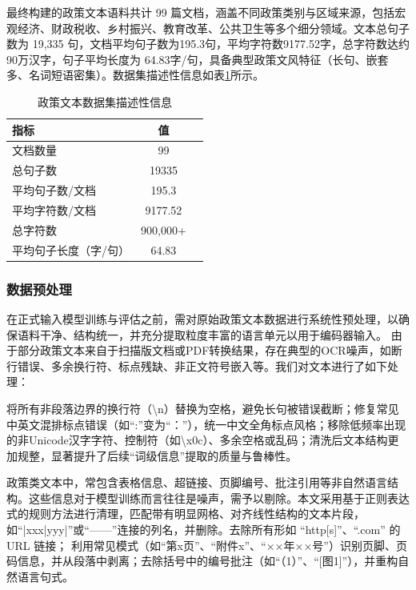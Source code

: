 \documentclass[12pt, a4paper]{ctexart}
\begin{document}
最终构建的政策文本语料共计 99 篇文档，涵盖不同政策类别与区域来源，包括宏观经济、财政税收、乡村振兴、教育改革、公共卫生等多个细分领域。文本总句子数为 19,335 句，文档平均句子数为195.3句，平均字符数9177.52字，总字符数达约90万汉字，句子平均长度为 64.83字/句，具备典型政策文风特征（长句、嵌套多、名词短语密集）。数据集描述性信息如表\ref{tab:policy_dataset_description}所示。

\begin{table}[H]
    \renewcommand{\arraystretch}{1}
    \centering
    \caption{政策文本数据集描述性信息}
    \label{tab:policy_dataset_description}
    \begin{tabular}{lcc}
        \toprule
        \textbf{指标} & \textbf{值} \\ 
        \midrule
        文档数量 & 99 \\
        总句子数 & 19335 \\
        平均句子数/文档 & 195.3 \\
        平均字符数/文档 & 9177.52 \\ 
        总字符数 & 900,000+ \\ 
        平均句子长度（字/句） & 64.83 \\
        \bottomrule
    \end{tabular}
\end{table}

\subsubsection{数据预处理}
在正式输入模型训练与评估之前，需对原始政策文本数据进行系统性预处理，以确保语料干净、结构统一，并充分提取粒度丰富的语言单元以用于编码器输入。
由于部分政策文本来自于扫描版文档或PDF转换结果，存在典型的OCR噪声，如断行错误、多余换行符、标点残缺、非正文符号嵌入等。我们对文本进行了如下处理：

将所有非段落边界的换行符（\textbackslash n）替换为空格，避免长句被错误截断；修复常见中英文混排标点错误（如“:”变为“：”），统一中文全角标点风格；移除低频率出现的非Unicode汉字字符、控制符（如\textbackslash x0c）、多余空格或乱码；清洗后文本结构更加规整，显著提升了后续“词级信息”提取的质量与鲁棒性。

政策类文本中，常包含表格信息、超链接、页脚编号、批注引用等非自然语言结构。这些信息对于模型训练而言往往是噪声，需予以剔除。本文采用基于正则表达式的规则方法进行清理，匹配带有明显网格、对齐线性结构的文本片段，如“|xxx|yyy|”或“——”连接的列名，并删除。去除所有形如 “http[s]”、“.com” 的 URL 链接；
利用常见模式（如“第x页”、“附件x”、“××年××号”）识别页脚、页码信息，并从段落中剥离；去除括号中的编号批注（如“（1）”、“[图1]”），并重构自然语言句式。
\end{document}

